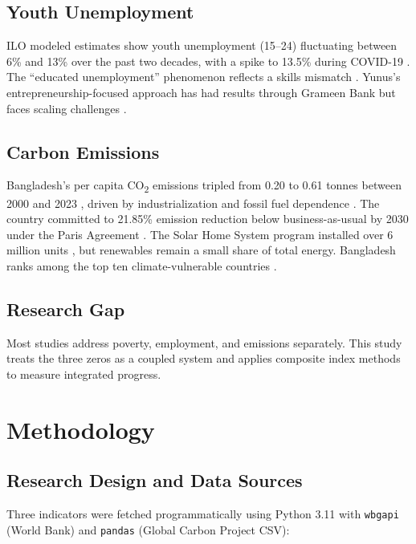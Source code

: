 \documentclass[12pt,a4paper]{article}
\begin{document}
\subsection{Youth Unemployment}

ILO modeled estimates show youth unemployment (15--24) fluctuating between 6\% and 13\% over the past two decades, with a spike to 13.5\% during COVID-19 \citep{ilo2023}. The ``educated unemployment'' phenomenon reflects a skills mismatch \citep{selim2021youth}. Yunus's entrepreneurship-focused approach has had results through Grameen Bank but faces scaling challenges \citep{yunus2017three}.

\subsection{Carbon Emissions}

Bangladesh's per capita CO\textsubscript{2} emissions tripled from 0.20 to 0.61 tonnes between 2000 and 2023 \citep{gcp2023}, driven by industrialization and fossil fuel dependence \citep{alam2012energy}. The country committed to 21.85\% emission reduction below business-as-usual by 2030 under the Paris Agreement \citep{gob2021ndc}. The Solar Home System program installed over 6 million units \citep{idcol2020}, but renewables remain a small share of total energy. Bangladesh ranks among the top ten climate-vulnerable countries \citep{germanwatch2021}.

\subsection{Research Gap}

Most studies address poverty, employment, and emissions separately. This study treats the three zeros as a coupled system and applies composite index methods to measure integrated progress.

\section{Methodology}

\subsection{Research Design and Data Sources}

Three indicators were fetched programmatically using Python 3.11 with \texttt{wbgapi} (World Bank) and \texttt{pandas} (Global Carbon Project CSV):
\end{document}
